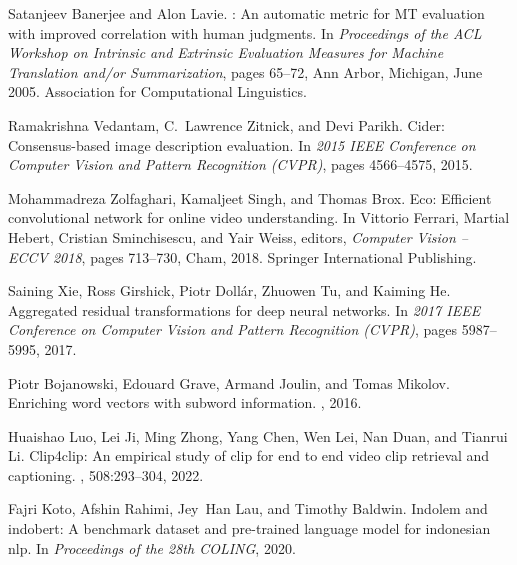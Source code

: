 \documentclass{article}
\begin{document}
\begin{thebibliography}{10}
Satanjeev Banerjee and Alon Lavie.
: An automatic metric for {MT} evaluation with improved
  correlation with human judgments.
\newblock In {\em Proceedings of the {ACL} Workshop on Intrinsic and Extrinsic
  Evaluation Measures for Machine Translation and/or Summarization}, pages
  65--72, Ann Arbor, Michigan, June 2005. Association for Computational
  Linguistics.

Ramakrishna Vedantam, C.~Lawrence Zitnick, and Devi Parikh.
\newblock Cider: Consensus-based image description evaluation.
\newblock In {\em 2015 IEEE Conference on Computer Vision and Pattern
  Recognition (CVPR)}, pages 4566--4575, 2015.

Mohammadreza Zolfaghari, Kamaljeet Singh, and Thomas Brox.
\newblock Eco: Efficient convolutional network for online video understanding.
\newblock In Vittorio Ferrari, Martial Hebert, Cristian Sminchisescu, and Yair
  Weiss, editors, {\em Computer Vision -- ECCV 2018}, pages 713--730, Cham,
  2018. Springer International Publishing.

Saining Xie, Ross Girshick, Piotr Dollár, Zhuowen Tu, and Kaiming He.
\newblock Aggregated residual transformations for deep neural networks.
\newblock In {\em 2017 IEEE Conference on Computer Vision and Pattern
  Recognition (CVPR)}, pages 5987--5995, 2017.

Piotr Bojanowski, Edouard Grave, Armand Joulin, and Tomas Mikolov.
\newblock Enriching word vectors with subword information.
, 2016.

Huaishao Luo, Lei Ji, Ming Zhong, Yang Chen, Wen Lei, Nan Duan, and Tianrui Li.
\newblock Clip4clip: An empirical study of clip for end to end video clip
  retrieval and captioning.
, 508:293--304, 2022.

Fajri Koto, Afshin Rahimi, Jey~Han Lau, and Timothy Baldwin.
\newblock Indolem and indobert: A benchmark dataset and pre-trained language
  model for indonesian nlp.
\newblock In {\em Proceedings of the 28th COLING}, 2020.

\end{thebibliography}
\end{document}
